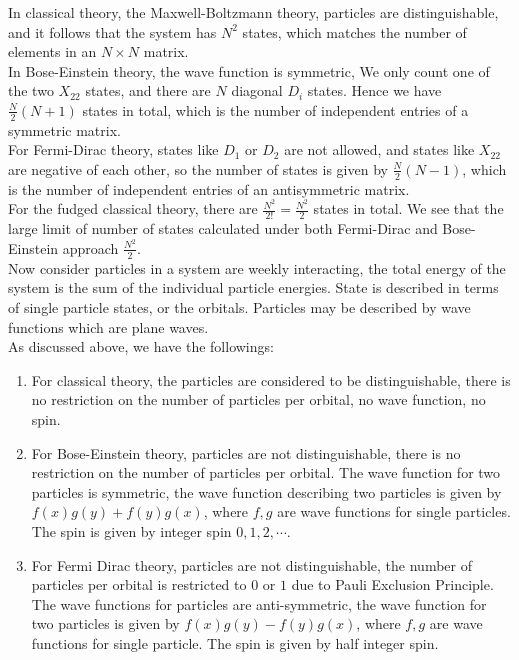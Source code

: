 \documentclass[11pt,oneside]{book}
\theoremstyle{break}
\theoremstyle{break}
\begin{document}
In classical theory, the Maxwell-Boltzmann theory, particles are distinguishable, and it follows that the system has $N^2$ states, which matches the number of elements in an $N\times N$ matrix. \\

In Bose-Einstein theory, the wave function is symmetric, We only count one of the two $X_{22}$ states, and there are $N$ diagonal $D_i$ states. Hence we have $\frac{N}{2}(N+1)$ states in total, which is the number of independent entries of a symmetric matrix. \\

For Fermi-Dirac theory, states like $D_1$ or $D_2$ are not allowed, and states like $X_{22}$ are negative of each other, so the number of states is given by $\frac{N}{2}(N-1)$, which is the number of independent entries of an antisymmetric matrix. \\

For the fudged classical theory, there are $\frac{N^2}{2!} = \frac{N^2}{2}$ states in total. We see that the large limit of number of states calculated under both Fermi-Dirac and Bose-Einstein approach $\frac{N^2}{2}$. \\

\hfill\break\hfill\break
Now consider particles in a system are weekly interacting, the total energy of the system is the sum of the individual particle energies. State is described in terms of single particle states, or the orbitals. Particles may be described by wave functions which are plane waves.\\

As discussed above, we have the followings:
\begin{enumerate}
\item For classical theory, the particles are considered to be distinguishable, there is no restriction on the number of particles per orbital, no wave function, no spin.
\item For Bose-Einstein theory, particles are not distinguishable, there is no restriction on the number of particles per orbital. The wave function for two particles is symmetric, the wave function describing two particles is given by $f(x) g(y) + f(y) g(x)$, where $f,g$ are wave functions for single particles. The spin is given by integer spin $0,1,2,\cdots$. 
\item For Fermi Dirac theory, particles are not distinguishable, the number of particles per orbital is restricted to $0$ or $1$ due to Pauli Exclusion Principle. The wave functions for particles are anti-symmetric, the wave function for two particles is given by $f(x)g(y) -f(y)g(x)$, where $f, g$ are wave functions for single particle. The spin is given by half integer spin.
\end{enumerate}
\end{document}
